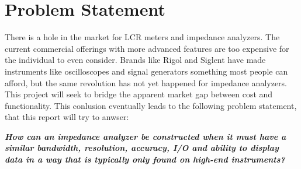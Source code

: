 \chapter{Problem Statement} \label{ch:ProblemStatement}
There is a hole in the market for LCR meters and impedance analyzers. The current commercial offerings with more advanced features are too expensive for the individual to even consider. Brands like Rigol and Siglent have made instruments like oscilloscopes and signal generators something most people can afford, but the same revolution has not yet happened for impedance analyzers. This project will seek to bridge the apparent market gap between cost and functionality. This conlusion eventually leads to the following problem statement,
that this report will try to anwser:

\textbf{\textit{How can an impedance analyzer be constructed when it must have a similar bandwidth, resolution, accuracy, I/O and ability to display data in a way that is typically only found on high-end instruments?}}